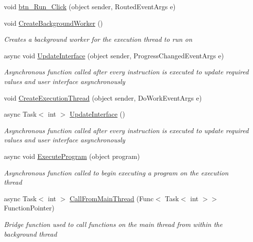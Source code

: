 \begin{DoxyCompactItemize}
void \hyperlink{class_c_p_u___o_s___simulator_1_1_main_window_a1f4dedca9ad81ea1c92637759515797f}{btn\+\_\+\+Run\+\_\+\+Click} (object sender, Routed\+Event\+Args e)
\item 
void \hyperlink{class_c_p_u___o_s___simulator_1_1_main_window_ad225bd7394d6ad45de9db58b562b91f7}{Create\+Background\+Worker} ()
\begin{DoxyCompactList}\small\item\em Creates a background worker for the execution thread to run on \end{DoxyCompactList}\item 
async void \hyperlink{class_c_p_u___o_s___simulator_1_1_main_window_a27c9bde14aab0b0a82f5e13e0a71c86c}{Update\+Interface} (object sender, Progress\+Changed\+Event\+Args e)
\begin{DoxyCompactList}\small\item\em Asynchronous function called after every instruction is executed to update required values and user interface asynchronously \end{DoxyCompactList}\item 
void \hyperlink{class_c_p_u___o_s___simulator_1_1_main_window_a83ba6352a96515569978030013c84b72}{Create\+Execution\+Thread} (object sender, Do\+Work\+Event\+Args e)
\item 
async Task$<$ int $>$ \hyperlink{class_c_p_u___o_s___simulator_1_1_main_window_adbb759abbf37061f785e82a9e7f7b3e1}{Update\+Interface} ()
\begin{DoxyCompactList}\small\item\em Asynchronous function called after every instruction is executed to update required values and user interface asynchronously \end{DoxyCompactList}\item 
async void \hyperlink{class_c_p_u___o_s___simulator_1_1_main_window_a03d4ec6b5990ad572db709f5305dd7ca}{Execute\+Program} (object program)
\begin{DoxyCompactList}\small\item\em Asynchronous function called to begin executing a program on the execution thread \end{DoxyCompactList}\item 
async Task$<$ int $>$ \hyperlink{class_c_p_u___o_s___simulator_1_1_main_window_a0712c91c3a03a4fabc2cdb2f4ed0a33b}{Call\+From\+Main\+Thread} (Func$<$ Task$<$ int $>$$>$ Function\+Pointer)
\begin{DoxyCompactList}\small\item\em Bridge function used to call functions on the main thread from within the background thread \end{DoxyCompactList}\item 
$$
\end{DoxyCompactItemize}
